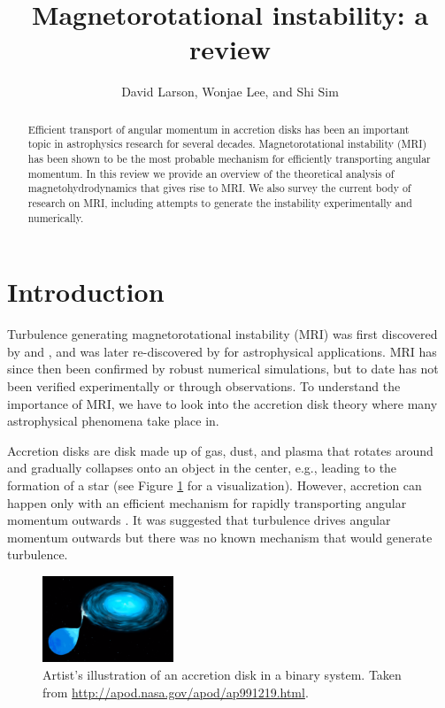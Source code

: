 \documentclass{jfm}
\title[Magnetorotational instability]{Magnetorotational instability: a review}
\author[D. Larson, W. Lee, and S. Sim]{David Larson, Wonjae Lee, and Shi Sim}
\affiliation{University of California, San Diego}
\begin{document}
\maketitle


\begin{abstract}
Efficient transport of angular momentum in accretion disks has been an
important topic in astrophysics research for several decades. Magnetorotational
instability (MRI) has been shown to be the most probable mechanism for
efficiently transporting angular momentum. In this review we provide an
overview of the theoretical analysis of magnetohydrodynamics that gives rise to
MRI. We also survey the current body of research on MRI, including attempts to
generate the instability experimentally and numerically.
\end{abstract}



\section{Introduction}
\label{sec:intro}

Turbulence generating magnetorotational instability (MRI) was first discovered
by \cite{Velikhov1959} and \cite{Chandrasekhar1960}, and was later
re-discovered by \cite{Balbus1998} for astrophysical applications. MRI has
since then been confirmed by robust numerical simulations, but to date has not
been verified experimentally or through observations. To understand the
importance of MRI, we have to look into the accretion disk theory where many
astrophysical phenomena take place in.

Accretion disks are disk made up of gas, dust, and plasma that rotates around
and gradually collapses onto an object in the center, e.g., leading to the
formation of a star (see Figure \ref{fig:accretion_disk} for a visualization).
However, accretion can happen only with an efficient mechanism for rapidly
transporting angular momentum outwards \citep{Julien2010}. It was suggested
that turbulence drives angular momentum outwards but there was no known
mechanism that would generate turbulence. 


\begin{figure}[t]
    \centering
    \includegraphics[width=0.35\textwidth]{accretion_disk}
        \caption{Artist's illustration of an accretion disk in a binary system. Taken from \url{http://apod.nasa.gov/apod/ap991219.html}.}
        \label{fig:accretion_disk}
\end{figure}
\end{document}
